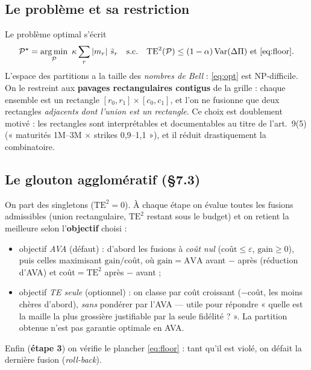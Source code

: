 \documentclass[11pt,a4paper]{article}
\DeclareMathOperator{\Var}{Var}
\DeclareMathOperator*{\argmin}{arg\,min}
\newcommand{\dPi}{\Delta\Pi}
\newcommand{\st}{\tilde{s}}
\newcommand{\abs}[1]{\left| #1 \right|}
\theoremstyle{plain}
\theoremstyle{definition}
\theoremstyle{remark}
\begin{document}
\subsection{Le problème et sa restriction}
Le problème optimal s'écrit
\begin{equation}
\mathcal P^\star = \argmin_{\mathcal P}\ \kappa \sum_r \abs{m_r}\,\st_r
\quad\text{s.c.}\quad
\mathrm{TE}^2(\mathcal P) \le (1-\alpha)\Var(\dPi)\ \text{et}\ \eqref{eq:floor}.
\label{eq:opt}
\end{equation}
L'espace des partitions a la taille des \emph{nombres de Bell} : \eqref{eq:opt} est
NP-difficile. On le restreint aux \textbf{pavages rectangulaires contigus} de la
grille : chaque ensemble est un rectangle $[r_0,r_1]\times[c_0,c_1]$, et l'on ne
fusionne que deux rectangles \emph{adjacents dont l'union est un rectangle}. Ce choix
est doublement motivé : les rectangles sont interprétables et documentables au titre de
l'art.~9(5) (« maturités 1M--3M $\times$ strikes 0{,}9--1{,}1 »), et il réduit
drastiquement la combinatoire.

\subsection{Le glouton agglomératif (\S7.3)}
On part des singletons ($\mathrm{TE}^2=0$). À chaque étape on évalue toutes les
fusions admissibles (union rectangulaire, $\mathrm{TE}^2$ restant sous le budget) et on
retient la meilleure selon l'\textbf{objectif} choisi :
\begin{itemize}[nosep]
\item objectif \emph{AVA} (défaut) : d'abord les fusions à \emph{coût nul}
      ($\text{coût}\le\varepsilon$, $\text{gain}\ge0$), puis celles maximisant
      $\text{gain}/\text{coût}$, où $\text{gain} = \mathrm{AVA}$ avant $-$ après
      (réduction d'AVA) et $\text{coût} = \mathrm{TE}^2$ après $-$ avant ;
\item objectif \emph{TE seule} (optionnel) : on classe par coût croissant
      ($-\text{coût}$, les moins chères d'abord), \emph{sans} pondérer par l'AVA ---
      utile pour répondre « quelle est la maille la plus grossière justifiable par la
      seule fidélité ? ». La partition obtenue n'est pas garantie optimale en AVA.
\end{itemize}
Enfin (\textbf{étape 3}) on vérifie le plancher \eqref{eq:floor} : tant qu'il est
violé, on défait la dernière fusion (\emph{roll-back}).
\end{document}
